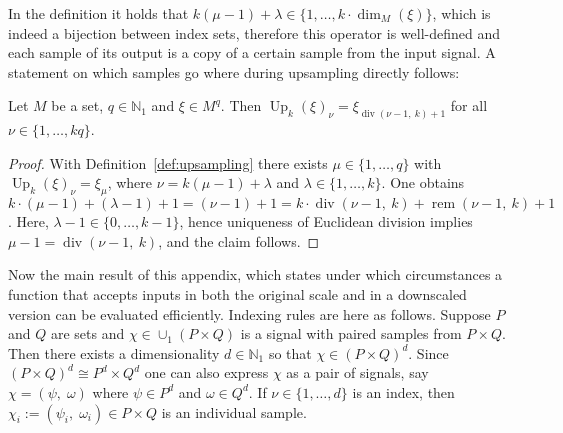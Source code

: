 \documentclass[journal]{IEEEtran}
\newcommand{\N}{\mathbb{N}}
\newcommand{\discint}[2]{\{#1,\dotsc,#2\}}
\newcommand{\inint}[2]{\in\discint{#1}{#2}}
\renewcommand{\div}[2]{\operatorname{div}(#1,\ #2)}
\newcommand{\rem}[2]{\operatorname{rem}(#1,\ #2)}
\DeclareMathOperator{\Upsampling}{Up}
\begin{document}
In the definition it holds that $k (\mu - 1) + \lambda\inint{1}{k\cdot\dim_M(\xi)}$, which is indeed a bijection between index sets, therefore this operator is well-defined and each sample of its output is a copy of a certain sample from the input signal.
A statement on which samples go where during upsampling directly follows:
\begin{lemma}
\label{lem:upsampling-props}
Let $M$ be a set, $q\in\N_1$ and $\xi\in M^q$.
Then $\Upsampling_k(\xi)_\nu = \xi_{\div{\nu - 1}{k} + 1}$ for all $\nu\inint{1}{kq}$.
\end{lemma}\begin{proof}
With Definition~\ref{def:upsampling} there exists $\mu\inint{1}{q}$ with $\Upsampling_k(\xi)_\nu = \xi_\mu$, where $\nu = k (\mu - 1) + \lambda$ and $\lambda\inint{1}{k}$.
One obtains
$k\cdot (\mu - 1) + (\lambda - 1) + 1 = (\nu - 1) + 1 = k\cdot\div{\nu - 1}{k} + \rem{\nu - 1}{k} + 1$.
Here, $\lambda - 1\inint{0}{k - 1}$, hence uniqueness of Euclidean division implies $\mu - 1 = \div{\nu - 1}{k}$, and the claim follows.
\end{proof}

Now the main result of this appendix, which states under which circumstances a function that accepts inputs in both the original scale and in a downscaled version can be evaluated efficiently.
Indexing rules are here as follows.
Suppose $P$ and $Q$ are sets and $\chi\in\cup_1(P\times Q)$ is a signal with paired samples from $P\times Q$.
Then there exists a dimensionality $d\in\N_1$ so that $\chi\in(P\times Q)^d$.
Since $(P\times Q)^d\cong P^d\times Q^d$ one can also express $\chi$ as a pair of signals, say $\chi = (\psi,\;\omega)$ where $\psi\in P^d$ and $\omega\in Q^d$.
If $\nu\inint{1}{d}$ is an index, then $\chi_i := (\psi_i,\;\omega_i)\in P\times Q$ is an individual sample.
\end{document}
